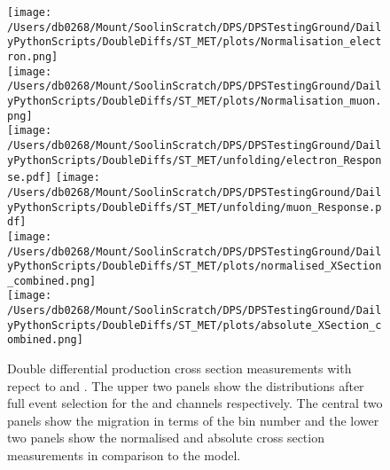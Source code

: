 \begin{figure}[htpb]
	\centering
	\texttt{[image: /Users/db0268/Mount/SoolinScratch/DPS/DPSTestingGround/DailyPythonScripts/DoubleDiffs/ST\_MET/plots/Normalisation\_electron.png]} \\
	\texttt{[image: /Users/db0268/Mount/SoolinScratch/DPS/DPSTestingGround/DailyPythonScripts/DoubleDiffs/ST\_MET/plots/Normalisation\_muon.png]} \\
	\vspace{0.8cm}
	\texttt{[image: /Users/db0268/Mount/SoolinScratch/DPS/DPSTestingGround/DailyPythonScripts/DoubleDiffs/ST\_MET/unfolding/electron\_Response.pdf]}
	\texttt{[image: /Users/db0268/Mount/SoolinScratch/DPS/DPSTestingGround/DailyPythonScripts/DoubleDiffs/ST\_MET/unfolding/muon\_Response.pdf]} \\
	\vspace{0.8cm}
	\texttt{[image: /Users/db0268/Mount/SoolinScratch/DPS/DPSTestingGround/DailyPythonScripts/DoubleDiffs/ST\_MET/plots/normalised\_XSection\_combined.png]} \\
	\texttt{[image: /Users/db0268/Mount/SoolinScratch/DPS/DPSTestingGround/DailyPythonScripts/DoubleDiffs/ST\_MET/plots/absolute\_XSection\_combined.png]} \\
	\vspace{0.4cm}
	\caption[Double differential \ttbar{} production cross section measurements with repect to \ST{} and \ptmiss{}. The upper two panels show the distributions after full event selection for the \eJets{} and \muJets{} channels respectively. The central two panels show the migration in terms of the bin number and the lower two panels show the normalised and absolute cross section measurements in comparison to the \powhegpythia{} model.]{Double differential \ttbar{} production cross section measurements with repect to \ST{} and \ptmiss{}. The upper two panels show the distributions after full event selection for the \eJets{} and \muJets{} channels respectively. The central two panels show the migration in terms of the bin number and the lower two panels show the normalised and absolute cross section measurements in comparison to the \powhegpythia{} model.}
	\label{fig:ST_MET}
\end{figure}
